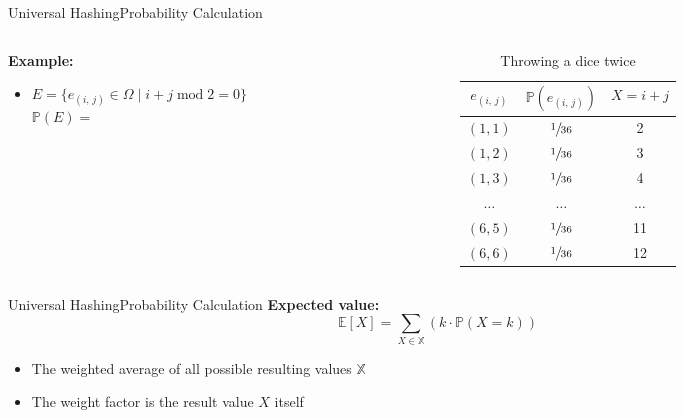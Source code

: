\begin{frame}{Universal Hashing}{Probability Calculation}
  \begin{columns}
    \begin{column}{0.55\linewidth}
      \textbf{Example:}
      \begin{itemize}
        \item
          $E = \{e_{(i,\,j)} \in \Omega
          \mid i + j \;\mathrm{mod}\; 2 = 0\}$\\
          $\mathbb{P}(E) =$
      \end{itemize}
    \end{column}
    \begin{column}{0.45\linewidth}
      \begin{table}[!h]
        \caption{Throwing a dice twice}
        \label{tab:probabilities_rolling_dice_twice3}
        \begin{tabularx}{0.95\linewidth}{c|cc}
          $e_{(i,\,j)}$ & $\mathbb{P}(e_{(i,\,j)})$ & $X = i + j$\\
          \midrule
          $(1, 1)$ & $\sfrac{1}{36}$ & 2\\
          $(1, 2)$ & $\sfrac{1}{36}$ & 3\\
          $(1, 3)$ & $\sfrac{1}{36}$ & 4\\
          $\dots$ & $\dots$ & $\dots$\\
          $(6, 5)$ & $\sfrac{1}{36}$ & 11\\
          $(6, 6)$ & $\sfrac{1}{36}$ & 12\\
        \end{tabularx}
      \end{table}
    \end{column}
  \end{columns}
\end{frame}


\begin{frame}{Universal Hashing}{Probability Calculation}
  \textbf{Expected value:}
  \[\mathbb{E}[X]
    = \sum_{X \in \mathbb{X}} \left(k \cdot \mathbb{P}(X = k)\right)\]
  \begin{itemize}
    \item
      The weighted average of all possible resulting values $\mathbb{X}$
    \item
      The weight factor is the result value $X$ itself
  \end{itemize}
\end{frame}

